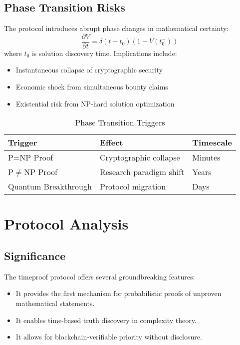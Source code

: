\documentclass[12pt]{report}
\begin{document}
\subsection{Phase Transition Risks}
The protocol introduces abrupt phase changes in mathematical certainty:
\begin{equation}
    \frac{\partial V}{\partial t} = \delta(t-t_0)(1 - V(t_0^-))
\end{equation}
where $t_0$ is solution discovery time. Implications include:
\begin{itemize}
    \item Instantaneous collapse of cryptographic security
    \item Economic shock from simultaneous bounty claims
    \item Existential risk from NP-hard solution optimization
\end{itemize}

\begin{table}[h]
\centering
\caption{Phase Transition Triggers}
\begin{tabular}{|l|l|l|}
\hline
\textbf{Trigger} & \textbf{Effect} & \textbf{Timescale} \\ \hline
P=NP Proof & Cryptographic collapse & Minutes \\ 
P$\neq$NP Proof & Research paradigm shift & Years \\
Quantum Breakthrough & Protocol migration & Days \\ \hline
\end{tabular}
\end{table}

\section{Protocol Analysis}
\subsection{Significance}

The timeproof protocol offers several groundbreaking features:

\begin{itemize}
    \item It provides the first mechanism for probabilistic proofs of unproven mathematical statements.
    \item It enables time-based truth discovery in complexity theory.
    \item It allows for blockchain-verifiable priority without disclosure.
\end{itemize}
\end{document}
